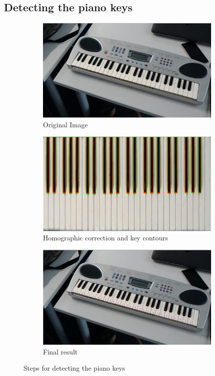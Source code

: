 \documentclass[12 pct]{report}
\begin{document}
\subsection *{Detecting the piano keys}

\begin{figure}[H]
  \centering
  \begin{subfigure}[b]{0.8\linewidth}
    \includegraphics[width=\linewidth]{piano-original}
     \caption{Original Image}
  \end{subfigure}
  \begin{subfigure}[b]{0.8\linewidth}
    \includegraphics[width=\linewidth]{piano-correction}
    \caption{Homographic correction and key contours}
  \end{subfigure}
  \begin{subfigure}[b]{0.8\linewidth}
    \includegraphics[width=\linewidth]{piano-points}
    \caption{Final result}
  \end{subfigure}
  \caption{Steps for detecting the piano keys}
  \label{fig:coffee3}
\end{figure}
\end{document}
